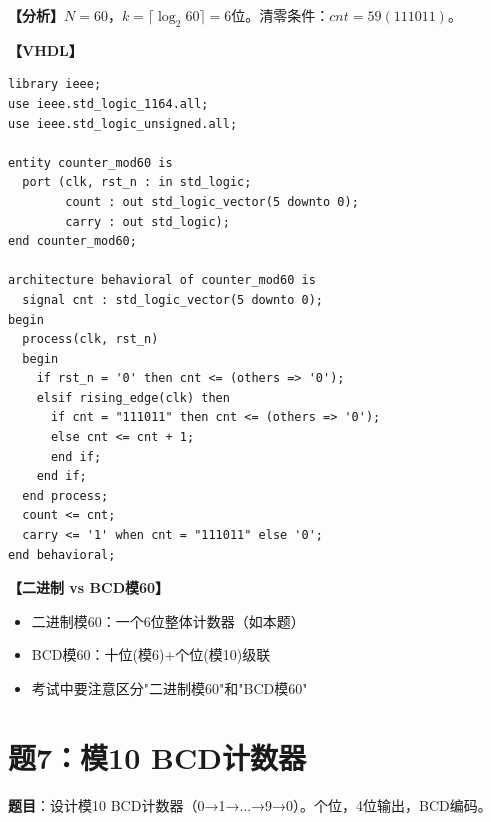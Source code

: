 \begin{solution}[完整解答]

\textbf{【分析】}$N=60$，$k=\lceil\log_2 60\rceil=6$位。清零条件：$cnt=59(111011)$。

\textbf{【VHDL】}
\begin{lstlisting}
library ieee;
use ieee.std_logic_1164.all;
use ieee.std_logic_unsigned.all;

entity counter_mod60 is
  port (clk, rst_n : in std_logic;
        count : out std_logic_vector(5 downto 0);
        carry : out std_logic);
end counter_mod60;

architecture behavioral of counter_mod60 is
  signal cnt : std_logic_vector(5 downto 0);
begin
  process(clk, rst_n)
  begin
    if rst_n = '0' then cnt <= (others => '0');
    elsif rising_edge(clk) then
      if cnt = "111011" then cnt <= (others => '0');
      else cnt <= cnt + 1;
      end if;
    end if;
  end process;
  count <= cnt;
  carry <= '1' when cnt = "111011" else '0';
end behavioral;
\end{lstlisting}

\textbf{【二进制 vs BCD模60】}
\begin{itemize}
  \item 二进制模60：一个6位整体计数器（如本题）
  \item BCD模60：十位(模6)+个位(模10)级联
  \item 考试中要注意区分"二进制模60"和"BCD模60"
\end{itemize}

\end{solution}


\section{题7：模10 BCD计数器}

\textbf{题目}：设计模10 BCD计数器（0→1→...→9→0）。个位，4位输出，BCD编码。


